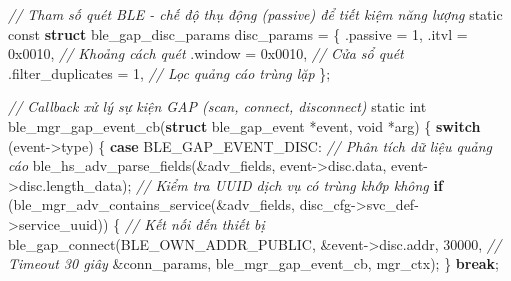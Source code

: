 \documentclass[13pt,a4paper]{extarticle}
\newenvironment{Shaded}{}{}
\newcommand{\BaseNTok}[1]{\textcolor[rgb]{0.25,0.63,0.44}{#1}}
\newcommand{\CommentTok}[1]{\textcolor[rgb]{0.38,0.63,0.69}{\textit{#1}}}
\newcommand{\ControlFlowTok}[1]{\textcolor[rgb]{0.00,0.44,0.13}{\textbf{#1}}}
\newcommand{\DataTypeTok}[1]{\textcolor[rgb]{0.56,0.13,0.00}{#1}}
\newcommand{\DecValTok}[1]{\textcolor[rgb]{0.25,0.63,0.44}{#1}}
\newcommand{\KeywordTok}[1]{\textcolor[rgb]{0.00,0.44,0.13}{\textbf{#1}}}
\newcommand{\NormalTok}[1]{#1}
\newcommand{\OperatorTok}[1]{\textcolor[rgb]{0.40,0.40,0.40}{#1}}
\renewcommand{\\}{\thesislongtableorignewline\hline}%
\begin{document}
\begin{Shaded}
\begin{Highlighting}[]
\CommentTok{// Tham số quét BLE {-} chế độ thụ động (passive) để tiết kiệm năng lượng}
\DataTypeTok{static} \DataTypeTok{const} \KeywordTok{struct}\NormalTok{ ble\_gap\_disc\_params disc\_params }\OperatorTok{=} \OperatorTok{\{}
    \OperatorTok{.}\NormalTok{passive           }\OperatorTok{=} \DecValTok{1}\OperatorTok{,}
    \OperatorTok{.}\NormalTok{itvl              }\OperatorTok{=} \BaseNTok{0x0010}\OperatorTok{,}   \CommentTok{// Khoảng cách quét}
    \OperatorTok{.}\NormalTok{window            }\OperatorTok{=} \BaseNTok{0x0010}\OperatorTok{,}   \CommentTok{// Cửa sổ quét}
    \OperatorTok{.}\NormalTok{filter\_duplicates }\OperatorTok{=} \DecValTok{1}\OperatorTok{,}        \CommentTok{// Lọc quảng cáo trùng lặp}
\OperatorTok{\};}

\CommentTok{// Callback xử lý sự kiện GAP (scan, connect, disconnect)}
\DataTypeTok{static} \DataTypeTok{int}\NormalTok{ ble\_mgr\_gap\_event\_cb}\OperatorTok{(}\KeywordTok{struct}\NormalTok{ ble\_gap\_event }\OperatorTok{*}\NormalTok{event}\OperatorTok{,} \DataTypeTok{void} \OperatorTok{*}\NormalTok{arg}\OperatorTok{)}
\OperatorTok{\{}
    \ControlFlowTok{switch} \OperatorTok{(}\NormalTok{event}\OperatorTok{{-}\textgreater{}}\NormalTok{type}\OperatorTok{)} \OperatorTok{\{}
    \ControlFlowTok{case}\NormalTok{ BLE\_GAP\_EVENT\_DISC}\OperatorTok{:}
        \CommentTok{// Phân tích dữ liệu quảng cáo}
\NormalTok{        ble\_hs\_adv\_parse\_fields}\OperatorTok{(\&}\NormalTok{adv\_fields}\OperatorTok{,}
\NormalTok{                                event}\OperatorTok{{-}\textgreater{}}\NormalTok{disc}\OperatorTok{.}\NormalTok{data}\OperatorTok{,}
\NormalTok{                                event}\OperatorTok{{-}\textgreater{}}\NormalTok{disc}\OperatorTok{.}\NormalTok{length\_data}\OperatorTok{);}
        \CommentTok{// Kiểm tra UUID dịch vụ có trùng khớp không}
        \ControlFlowTok{if} \OperatorTok{(}\NormalTok{ble\_mgr\_adv\_contains\_service}\OperatorTok{(\&}\NormalTok{adv\_fields}\OperatorTok{,}
\NormalTok{                                          disc\_cfg}\OperatorTok{{-}\textgreater{}}\NormalTok{svc\_def}\OperatorTok{{-}\textgreater{}}\NormalTok{service\_uuid}\OperatorTok{))} \OperatorTok{\{}
            \CommentTok{// Kết nối đến thiết bị}
\NormalTok{            ble\_gap\_connect}\OperatorTok{(}\NormalTok{BLE\_OWN\_ADDR\_PUBLIC}\OperatorTok{,}
                            \OperatorTok{\&}\NormalTok{event}\OperatorTok{{-}\textgreater{}}\NormalTok{disc}\OperatorTok{.}\NormalTok{addr}\OperatorTok{,}
                            \DecValTok{30000}\OperatorTok{,}           \CommentTok{// Timeout 30 giây}
                            \OperatorTok{\&}\NormalTok{conn\_params}\OperatorTok{,}
\NormalTok{                            ble\_mgr\_gap\_event\_cb}\OperatorTok{,}\NormalTok{ mgr\_ctx}\OperatorTok{);}
        \OperatorTok{\}}
        \ControlFlowTok{break}\OperatorTok{;}


\end{Highlighting}
\end{Shaded}
\end{document}
